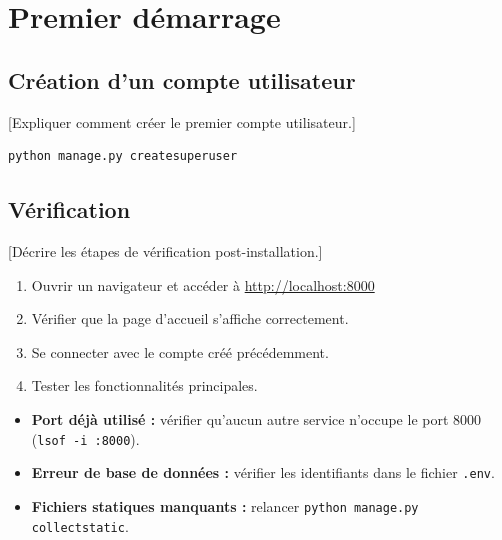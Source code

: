 \documentclass[12pt, a4paper]{article}
\begin{document}
\section{Premier démarrage}

\subsection{Création d'un compte utilisateur}

[Expliquer comment créer le premier compte utilisateur.]

\begin{lstlisting}[language=bash, caption=Création d'un superutilisateur]
python manage.py createsuperuser
\end{lstlisting}

\subsection{Vérification}

[Décrire les étapes de vérification post-installation.]

\begin{enumerate}
  \item Ouvrir un navigateur et accéder à \url{http://localhost:8000}
  \item Vérifier que la page d'accueil s'affiche correctement.
  \item Se connecter avec le compte créé précédemment.
  \item Tester les fonctionnalités principales.
\end{enumerate}

\begin{remarque}
  \begin{itemize}
    \item \textbf{Port déjà utilisé :} vérifier qu'aucun autre service n'occupe
      le port 8000 (\texttt{lsof -i :8000}).
    \item \textbf{Erreur de base de données :} vérifier les identifiants dans
      le fichier \texttt{.env}.
    \item \textbf{Fichiers statiques manquants :} relancer
      \texttt{python manage.py collectstatic}.
  \end{itemize}
\end{remarque}
\end{document}
